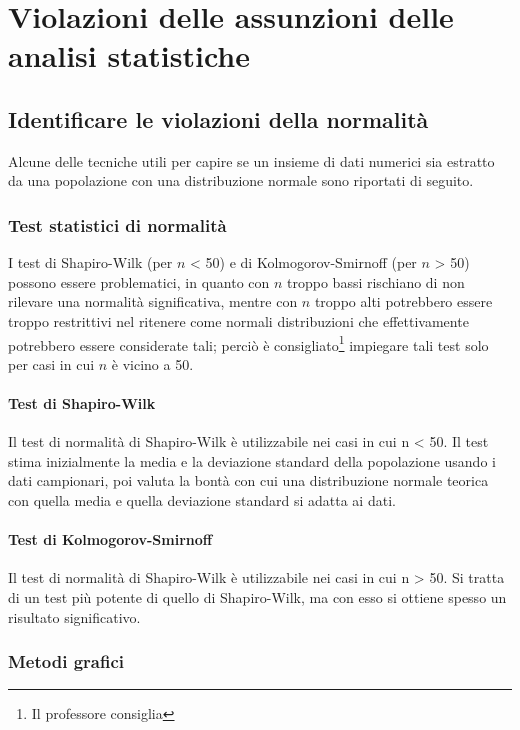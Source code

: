\documentclass[10pt, draft]{book}
\begin{document}
\chapter{Violazioni delle assunzioni delle analisi statistiche}

\section{Identificare le violazioni della normalità}

Alcune delle tecniche utili per capire se un insieme di dati numerici sia estratto da una popolazione con una distribuzione normale sono riportati di seguito.

\subsection{Test statistici di normalità}

I test di Shapiro-Wilk (per $n$ < 50) e di Kolmogorov-Smirnoff (per $n$ > 50) possono essere problematici, in quanto con $n$ troppo bassi rischiano di non rilevare una normalità significativa, mentre con $n$ troppo alti potrebbero essere troppo restrittivi nel ritenere come normali distribuzioni che effettivamente potrebbero essere considerate tali; perciò è consigliato\footnote{Il professore consiglia} impiegare tali test solo per casi in cui $n$ è vicino a 50.

\subsubsection{Test di Shapiro-Wilk}

Il test di normalità di Shapiro-Wilk è utilizzabile nei casi in cui n < 50. Il test stima inizialmente la media e la deviazione standard della popolazione usando i dati campionari, poi valuta la bontà con cui una distribuzione normale teorica con quella media e quella deviazione standard si adatta ai dati.

\subsubsection{Test di Kolmogorov-Smirnoff}

Il test di normalità di Shapiro-Wilk è utilizzabile nei casi in cui n > 50. Si tratta di un test più potente di quello di Shapiro-Wilk, ma con esso si ottiene spesso un risultato significativo.

\subsection{Metodi grafici}
\end{document}
